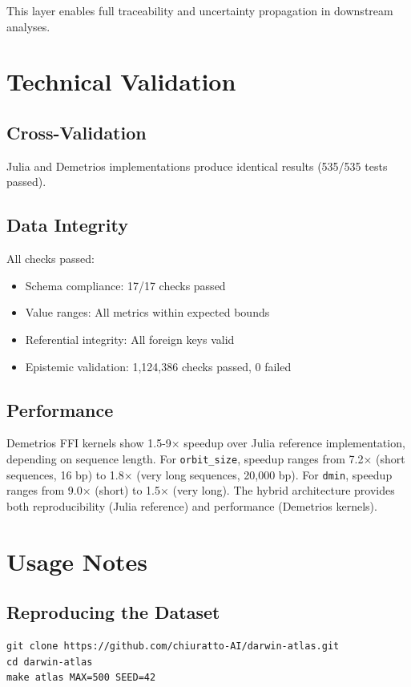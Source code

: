 \documentclass[12pt,a4paper]{article}
\begin{document}
This layer enables full traceability and uncertainty propagation in downstream analyses.

\section{Technical Validation}

\subsection{Cross-Validation}
Julia and Demetrios implementations produce identical results (535/535 tests passed).

\subsection{Data Integrity}
All checks passed:
\begin{itemize}
\item Schema compliance: 17/17 checks passed
\item Value ranges: All metrics within expected bounds
\item Referential integrity: All foreign keys valid
\item Epistemic validation: 1,124,386 checks passed, 0 failed
\end{itemize}

\subsection{Performance}
Demetrios FFI kernels show 1.5-9× speedup over Julia reference implementation, depending on sequence length. For \texttt{orbit\_size}, speedup ranges from 7.2× (short sequences, 16 bp) to 1.8× (very long sequences, 20,000 bp). For \texttt{dmin}, speedup ranges from 9.0× (short) to 1.5× (very long). The hybrid architecture provides both reproducibility (Julia reference) and performance (Demetrios kernels).

\section{Usage Notes}

\subsection{Reproducing the Dataset}
\begin{verbatim}
git clone https://github.com/chiuratto-AI/darwin-atlas.git
cd darwin-atlas
make atlas MAX=500 SEED=42
\end{verbatim}
\end{document}

